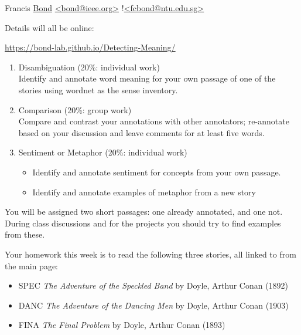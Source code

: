 \documentclass[a4paper,landscape,headrule,footrule,xetex,25pt]{foils}
\begin{document}
\begin{description}\addtolength{\itemsep}{-5mm}
\item [Coordinator]  Francis \ul{Bond} 
{\small \url{<bond@ieee.org>} !\url{<fcbond@ntu.edu.sg>}}
\item Details will all be  online:
  \begin{center}
    \url{https://bond-lab.github.io/Detecting-Meaning/}    
  \end{center}
\end{description}

\begin{enumerate}
\item Disambiguation (20\%: individual work)
  \\ Identify and annotate word meaning for your own passage of one of the stories using wordnet as the sense inventory.
\item Comparison (20\%: group work)
  \\ Compare and contrast your annotations with other annotators; re-annotate based on your discussion and leave comments for at least five words.
\item Sentiment or Metaphor (20\%: individual work)
  \begin{itemize}
  \item  Identify and annotate sentiment for concepts from your own
  passage.
\item  Identify and annotate examples of metaphor from a new story
\end{itemize}

\end{enumerate}

You will be assigned two short passages: one already annotated, and
one not.  During class discussions and for the projects you should try
to find examples from these.

Your homework this week is to read the following three stories, all
linked to from the main page:
\begin{itemize}\addtolength{\itemsep}{-2ex}
\item SPEC \textit{The Adventure of the Speckled Band} by
  Doyle, Arthur Conan (1892)
\item DANC \textit{The Adventure
  of the Dancing Men} by Doyle, Arthur Conan (1903) 
\item FINA \textit{The  Final Problem}
   by Doyle, Arthur Conan (1893) 
\end{itemize}
\end{document}
